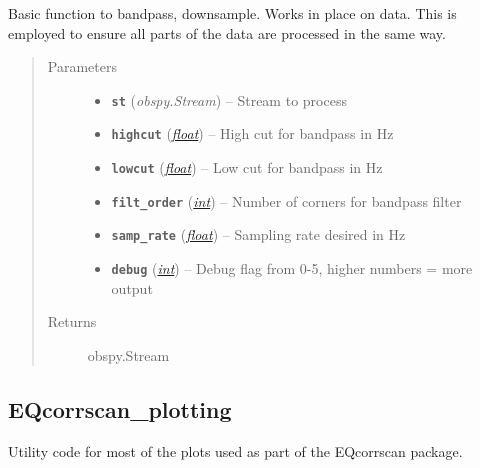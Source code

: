\documentclass[a4paper,10pt,english]{sphinxmanual}
\begin{document}
\begin{fulllineitems}
\label{utils:pre_processing.shortproc}
Basic function to bandpass, downsample.  Works in place
on data.  This is employed to ensure all parts of the data are processed
in the same way.
\begin{quote}\begin{description}
\item[{Parameters}] \leavevmode\begin{itemize}
\item {} 
\textbf{\texttt{st}} (\emph{obspy.Stream}) -- Stream to process

\item {} 
\textbf{\texttt{highcut}} (\href{https://docs.python.org/library/functions.html\#float}{\emph{float}}) -- High cut for bandpass in Hz

\item {} 
\textbf{\texttt{lowcut}} (\href{https://docs.python.org/library/functions.html\#float}{\emph{float}}) -- Low cut for bandpass in Hz

\item {} 
\textbf{\texttt{filt\_order}} (\href{https://docs.python.org/library/functions.html\#int}{\emph{int}}) -- Number of corners for bandpass filter

\item {} 
\textbf{\texttt{samp\_rate}} (\href{https://docs.python.org/library/functions.html\#float}{\emph{float}}) -- Sampling rate desired in Hz

\item {} 
\textbf{\texttt{debug}} (\href{https://docs.python.org/library/functions.html\#int}{\emph{int}}) -- Debug flag from 0-5, higher numbers = more output

\end{itemize}

\item[{Returns}] \leavevmode
obspy.Stream

\end{description}\end{quote}

\end{fulllineitems}



\subsection{EQcorrscan\_plotting}
\label{utils:module-EQcorrscan_plotting}\label{utils:eqcorrscan-plotting}
Utility code for most of the plots used as part of the EQcorrscan package.
\end{document}
